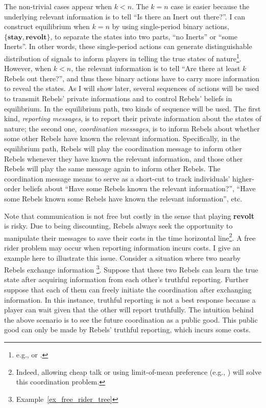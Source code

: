 \documentclass[12pt,letter]{article}
\theoremstyle{definition}
\theoremstyle{remark}
\theoremstyle{claim}
\begin{document}
The non-trivial cases appear when $k<n$. The $k=n$ case is easier because the underlying relevant information is to tell ``Is there an Inert out there?''. I can construct equilibrium when $k=n$ by using single-period binary actions, $\{\textbf{stay},\textbf{revolt}\}$, to separate the states into two parts, ``no Inerts'' or ``some Inerts''. In other words, these single-period actions can generate distinguishable distribution of signals to inform players in telling the true states of nature\footnote{e.g., \citep{Fudenberg2010} or \citep{Fudenberg2011}.}. However, when $k<n$, the relevant information is to tell ``Are there at least $k$ Rebels out there?'', and thus these binary actions have to carry more information to reveal the states. As I will show later, several sequences of actions will be used to transmit Rebels' private informations and to control Rebels' beliefs in equilibrium. In the equilibrium path, two kinds of sequence will be used. The first kind, \textit{reporting messages}, is to report their private information about the states of nature; the second one, \textit{coordination messages}, is to inform Rebels about whether some other Rebels have known the relevant information.  Specifically, in the equilibrium path, Rebels will play the coordination message to inform other Rebels whenever they have known the relevant information, and those other Rebels will play the same message again to inform other Rebels. The coordination message means to serve as a short-cut to track individuals' higher-order beliefs about ``Have some Rebels known the relevant information?'', ``Have some Rebels known some Rebels have known the relevant information'', etc.


Note that communication is not free but costly in the sense that playing \textbf{revolt} is risky. Due to being discounting, Rebels always seek the opportunity to manipulate their messages to save their costs in the time horizontal line\footnote{Indeed, allowing cheap talk or using limit-of-mean preference (e.g., \citep{Renault1998}) will solve this coordination problem.}. A free rider problem may occur when reporting information incurs costs. I give an example here to illustrate this issue. Consider a situation where two nearby Rebels exchange information \footnote{Example~\ref{ex_free_rider_tree}}. Suppose that these two Rebels can learn the true state after acquiring information from each other's truthful reporting. Further suppose that each of them can freely initiate the coordination after exchanging information. In this instance, truthful reporting is not a best response because a player can wait given that the other will report truthfully. The intuition behind the above scenario is to see the future coordination as a public good. This public good can only be made by Rebels' truthful reporting, which incurs some costs.
\end{document}
